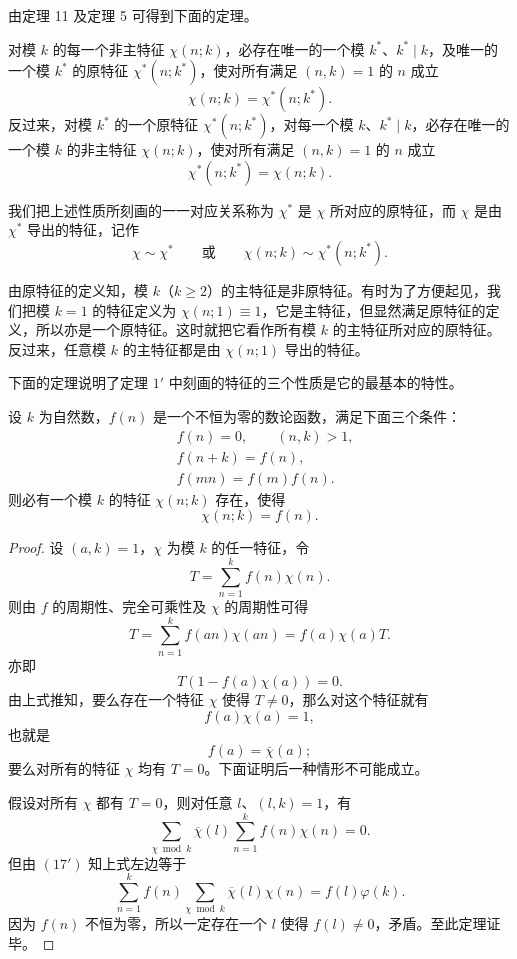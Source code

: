 由定理 11 及定理 5 可得到下面的定理。

\begin{theorem}[原文 定理 13]
	对模 $k$ 的每一个非主特征 $\chi(n;k)$，必存在唯一的一个模 $k^*$、$k^*\mid k$，及唯一的一个模 $k^*$ 的原特征 $\chi^*(n;k^*)$，使对所有满足 $(n,k)=1$ 的 $n$ 成立
	\[
		\chi(n;k)=\chi^*(n;k^*).
	\]
	反过来，对模 $k^*$ 的一个原特征 $\chi^*(n;k^*)$，对每一个模 $k$、$k^*\mid k$，必存在唯一的一个模 $k$ 的非主特征 $\chi(n;k)$，使对所有满足 $(n,k)=1$ 的 $n$ 成立
	\[
		\chi^*(n;k^*)=\chi(n;k).
	\]
\end{theorem}

我们把上述性质所刻画的一一对应关系称为 $\chi^*$ 是 $\chi$ 所对应的原特征，而 $\chi$ 是由 $\chi^*$ 导出的特征，记作
\[
	\chi\sim\chi^*
	\qquad\text{或}\qquad
	\chi(n;k)\sim \chi^*(n;k^*).
\]

由原特征的定义知，模 $k$（$k\geq2$）的主特征是非原特征。有时为了方便起见，我们把模 $k=1$ 的特征定义为 $\chi(n;1)\equiv1$，它是主特征，但显然满足原特征的定义，所以亦是一个原特征。这时就把它看作所有模 $k$ 的主特征所对应的原特征。反过来，任意模 $k$ 的主特征都是由 $\chi(n;1)$ 导出的特征。

下面的定理说明了定理 \(1'\) 中刻画的特征的三个性质是它的最基本的特性。

\begin{theorem}[原文 定理 14]
	设 $k$ 为自然数，$f(n)$ 是一个不恒为零的数论函数，满足下面三个条件：
	\[
	\begin{aligned}
		&f(n)=0,\qquad (n,k)>1,\\
		&f(n+k)=f(n),\\
		&f(mn)=f(m)f(n).
	\end{aligned}
	\]
	则必有一个模 $k$ 的特征 $\chi(n;k)$ 存在，使得
	\[
		\chi(n;k)=f(n).
	\]
\end{theorem}

\begin{proof}
	设 $(a,k)=1$，$\chi$ 为模 $k$ 的任一特征，令
	\[
		T=\sum_{n=1}^{k} f(n)\chi(n).
	\]
	则由 $f$ 的周期性、完全可乘性及 $\chi$ 的周期性可得
	\[
		T
		=
		\sum_{n=1}^{k}f(an)\chi(an)
		=
		f(a)\chi(a)T.
	\]
	亦即
	\[
		T(1-f(a)\chi(a))=0.
	\]
	由上式推知，要么存在一个特征 $\chi$ 使得 $T\neq0$，那么对这个特征就有
	\[
		f(a)\chi(a)=1,
	\]
	也就是
	\[
		f(a)=\overline{\chi}(a);
	\]
	要么对所有的特征 $\chi$ 均有 $T=0$。下面证明后一种情形不可能成立。

	假设对所有 $\chi$ 都有 $T=0$，则对任意 $l$、$(l,k)=1$，有
	\[
		\sum_{\chi\bmod k}\overline{\chi}(l)
		\sum_{n=1}^{k}f(n)\chi(n)
		=0.
	\]
	但由 \((17')\) 知上式左边等于
	\[
		\sum_{n=1}^{k}f(n)\sum_{\chi\bmod k}\overline{\chi}(l)\chi(n)
		=
		f(l)\varphi(k).
	\]
	因为 $f(n)$ 不恒为零，所以一定存在一个 $l$ 使得 $f(l)\neq0$，矛盾。至此定理证毕。
\end{proof}


